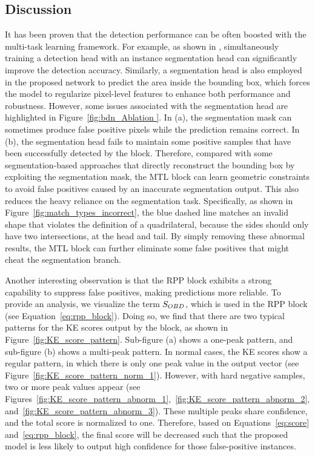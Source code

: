 \subsection{Discussion}

It has been proven that the detection performance can be often boosted with
the multi-task learning framework. For example, as shown in \cite{he2017mask},  simultaneously training a detection head with an instance segmentation head can significantly improve the detection accuracy. Similarly, a segmentation head is also employed in the proposed \Ours network to predict the area inside the bounding box, which forces the model to regularize pixel-level features to enhance both performance and robustness. However, some issues associated with the segmentation head are highlighted in Figure~\ref{fig:bdn_Ablation }. In (a), the segmentation mask can sometimes produce false positive pixels while the \Ours prediction remains correct. In (b), the segmentation head fails to maintain some positive samples that have been successfully detected by the \Ours block. Therefore, compared with some segmentation-based approaches that directly reconstruct the bounding box by exploiting the segmentation mask, the MTL block can learn geometric constraints to avoid false positives caused by an inaccurate segmentation output. This also reduces the heavy reliance on the segmentation task. Specifically, as shown in Figure~\ref{fig:match_types_incorrect}, the blue dashed line matches an invalid shape that violates the definition of a quadrilateral, because the sides should only have two intersections, at the head and tail. By simply removing these abnormal results, the MTL block can further eliminate some false positives that might cheat the segmentation branch.

Another interesting observation is that the RPP block exhibits a strong capability to suppress false positives, making predictions more reliable. To provide an analysis, we visualize the term $S_{   {OBD}  }$, which is used in the RPP block (see Equation~\eqref{eq:rpp_block}). Doing so, we find that there are two typical patterns for the KE scores output by the \Ours block, as shown in Figure~\ref{fig:KE_score_pattern}. Sub-figure (a) shows a one-peak pattern, and sub-figure (b) shows a multi-peak pattern. In normal cases, the KE scores show a regular pattern, in which there is only one peak value in the output vector (see Figure~\ref{fig:KE_score_pattern_norm_1}). However, with hard negative samples, two or more peak values appear (see Figures~\ref{fig:KE_score_pattern_abnorm_1},~\ref{fig:KE_score_pattern_abnorm_2}, and~\ref{fig:KE_score_pattern_abnorm_3}). These multiple peaks share confidence, and the total score is normalized to one. Therefore, based on Equations~\eqref{eq:score} and~\eqref{eq:rpp_block}, the final score will be decreased such that 
the proposed model is less likely to output
high confidence for those false-positive instances.

